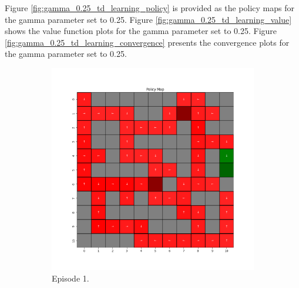 \documentclass{assignment}
\begin{document}
Figure \ref{fig:gamma_0.25_td_learning_policy} is provided as the policy maps for the gamma parameter set to 0.25. Figure \ref{fig:gamma_0.25_td_learning_value} shows the value function plots for the gamma parameter set to 0.25. Figure \ref{fig:gamma_0.25_td_learning_convergence} presents the convergence plots for the gamma parameter set to 0.25.
\begin{figure}[H]
    \begin{subfigure}{0.3\textwidth}
        \includegraphics[width=\textwidth]{figures/policy_td/gamma_sweep/policy_alpha_0.1_gamma_0.25_epsilon_0.2_iteration_1.png}
    \caption{Episode 1.}
    \end{subfigure}\hfill
    \begin{subfigure}{0.3\textwidth}

\end{subfigure}
\end{figure}
\end{document}
